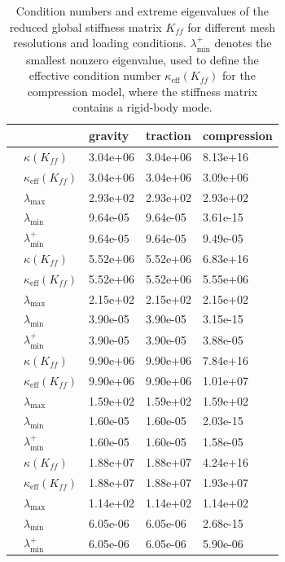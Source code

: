 \begin{table}[H]\centering\small\begin{tabular}{m{1.5cm}|m{2.3cm}|m{2.2cm}m{2.2cm}m{2.2cm}}
\toprule
 &  & gravity & traction & compression \\
\midrule
{} & $\kappa(K_{ff})$ & 3.04e+06 & 3.04e+06 & 8.13e+16 \\
 & $\kappa_{\mathrm{eff}}(K_{ff})$ & 3.04e+06 & 3.04e+06 & 3.09e+06 \\
 & $\lambda_{\max}$ & 2.93e+02 & 2.93e+02 & 2.93e+02 \\
 & $\lambda_{\min}$ & 9.64e-05 & 9.64e-05 & 3.61e-15 \\
 & $\lambda_{\min}^{+}$ & 9.64e-05 & 9.64e-05 & 9.49e-05 \\
 & $\kappa(K_{ff})$ & 5.52e+06 & 5.52e+06 & 6.83e+16 \\
 & $\kappa_{\mathrm{eff}}(K_{ff})$ & 5.52e+06 & 5.52e+06 & 5.55e+06 \\
 & $\lambda_{\max}$ & 2.15e+02 & 2.15e+02 & 2.15e+02 \\
 & $\lambda_{\min}$ & 3.90e-05 & 3.90e-05 & 3.15e-15 \\
 & $\lambda_{\min}^{+}$ & 3.90e-05 & 3.90e-05 & 3.88e-05 \\
 & $\kappa(K_{ff})$ & 9.90e+06 & 9.90e+06 & 7.84e+16 \\
 & $\kappa_{\mathrm{eff}}(K_{ff})$ & 9.90e+06 & 9.90e+06 & 1.01e+07 \\
 & $\lambda_{\max}$ & 1.59e+02 & 1.59e+02 & 1.59e+02 \\
 & $\lambda_{\min}$ & 1.60e-05 & 1.60e-05 & 2.03e-15 \\
 & $\lambda_{\min}^{+}$ & 1.60e-05 & 1.60e-05 & 1.58e-05 \\
 & $\kappa(K_{ff})$ & 1.88e+07 & 1.88e+07 & 4.24e+16 \\
 & $\kappa_{\mathrm{eff}}(K_{ff})$ & 1.88e+07 & 1.88e+07 & 1.93e+07 \\
 & $\lambda_{\max}$ & 1.14e+02 & 1.14e+02 & 1.14e+02 \\
 & $\lambda_{\min}$ & 6.05e-06 & 6.05e-06 & 2.68e-15 \\
 & $\lambda_{\min}^{+}$ & 6.05e-06 & 6.05e-06 & 5.90e-06 \\
\bottomrule
\end{tabular}\caption{Condition numbers and extreme eigenvalues of the reduced global stiffness matrix $K_{ff}$ for different mesh resolutions and loading conditions. $\lambda_{\min}^{+}$ denotes the smallest nonzero eigenvalue, used to define the effective condition number $\kappa_{\mathrm{eff}}(K_{ff})$ for the compression model, where the stiffness matrix contains a rigid-body mode.}\label{tab:conditioning}\end{table}
